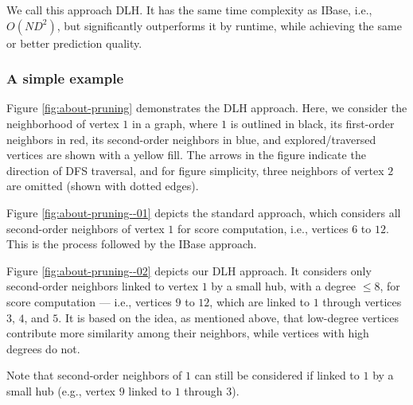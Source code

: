 We call this approach DLH. It has the same time complexity as IBase, i.e., $O(ND^2)$, but significantly outperforms it by runtime, while achieving the same or better prediction quality.


\subsubsection{A simple example}

Figure \ref{fig:about-pruning} demonstrates the DLH approach. Here, we consider the neighborhood of vertex $1$ in a graph, where $1$ is outlined in black, its first-order neighbors in red, its second-order neighbors in blue, and explored/traversed vertices are shown with a yellow fill. The arrows in the figure indicate the direction of DFS traversal, and for figure simplicity, three neighbors of vertex $2$ are omitted (shown with dotted edges).


Figure \ref{fig:about-pruning--01} depicts the standard approach, which considers all second-order neighbors of vertex $1$ for score computation, i.e., vertices $6$ to $12$. This is the process followed by the IBase approach.


Figure \ref{fig:about-pruning--02} depicts our DLH approach. It considers only second-order neighbors linked to vertex $1$ by a small hub, with a degree $\leq 8$, for score computation --- i.e., vertices $9$ to $12$, which are linked to $1$ through vertices $3$, $4$, and $5$. It is based on the idea, as mentioned above, that low-degree vertices contribute more similarity among their neighbors, while vertices with high degrees do not. Note that second-order neighbors of $1$ can still be considered if linked to $1$ by a small hub (e.g., vertex $9$ linked to $1$ through $3$).


